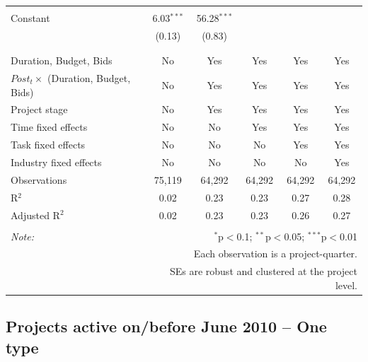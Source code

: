 \documentclass[
]{article}
\begin{document}
\begin{table}[H]
\begin{tabular}{@{\extracolsep{-2pt}}lccccc}
  & & & & & \\ 
 Constant & 6.03$^{***}$ & 56.28$^{***}$ &  &  &  \\ 
  & (0.13) & (0.83) &  &  &  \\ 
  & & & & & \\ 
\hline \\[-1.8ex] 
Duration, Budget, Bids & No & Yes & Yes & Yes & Yes \\ 
$Post_t \times $  (Duration, Budget, Bids) & No & Yes & Yes & Yes & Yes \\ 
Project stage & No & Yes & Yes & Yes & Yes \\ 
Time fixed effects & No & No & Yes & Yes & Yes \\ 
Task fixed effects & No & No & No & Yes & Yes \\ 
Industry fixed effects & No & No & No & No & Yes \\ 
Observations & 75,119 & 64,292 & 64,292 & 64,292 & 64,292 \\ 
R$^{2}$ & 0.02 & 0.23 & 0.23 & 0.27 & 0.28 \\ 
Adjusted R$^{2}$ & 0.02 & 0.23 & 0.23 & 0.26 & 0.27 \\ 
\hline 
\hline \\[-1.8ex] 
\textit{Note:}  & \multicolumn{5}{r}{$^{*}$p$<$0.1; $^{**}$p$<$0.05; $^{***}$p$<$0.01} \\ 
 & \multicolumn{5}{r}{Each observation is a project-quarter.} \\ 
 & \multicolumn{5}{r}{SEs are robust and clustered at the project level.} \\ 
\end{tabular} 
\end{table}

\hypertarget{projects-active-onbefore-june-2010-one-type}{%
\subsection{Projects active on/before June 2010 -- One
type}\label{projects-active-onbefore-june-2010-one-type}}
\end{document}
